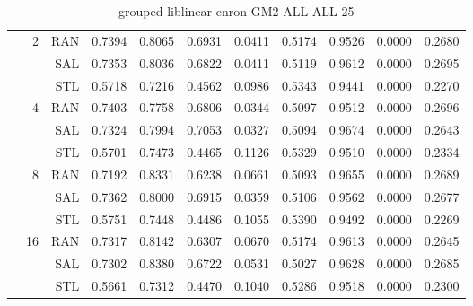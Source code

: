 \begin{center}
\begin{table}[htbp]
\begin{tabular}{ | r | r | r | r | r | r | r | r | r | r | r |}
 & \multirow{3}{*}{2} & RAN & 0.7394 & 0.8065 & 0.6931 & 0.0411 & 0.5174 & 0.9526 & 0.0000 & 0.2680\\ \cline{3-11}
 &   & SAL & 0.7353 & 0.8036 & 0.6822 & 0.0411 & 0.5119 & 0.9612 & 0.0000 & 0.2695\\ \cline{3-11}
 &   & STL & 0.5718 & 0.7216 & 0.4562 & 0.0986 & 0.5343 & 0.9441 & 0.0000 & 0.2270\\ \cline{2-11}
 & \multirow{3}{*}{4} & RAN & 0.7403 & 0.7758 & 0.6806 & 0.0344 & 0.5097 & 0.9512 & 0.0000 & 0.2696\\ \cline{3-11}
 &   & SAL & 0.7324 & 0.7994 & 0.7053 & 0.0327 & 0.5094 & 0.9674 & 0.0000 & 0.2643\\ \cline{3-11}
 &   & STL & 0.5701 & 0.7473 & 0.4465 & 0.1126 & 0.5329 & 0.9510 & 0.0000 & 0.2334\\ \cline{2-11}
 & \multirow{3}{*}{8} & RAN & 0.7192 & 0.8331 & 0.6238 & 0.0661 & 0.5093 & 0.9655 & 0.0000 & 0.2689\\ \cline{3-11}
 &   & SAL & 0.7362 & 0.8000 & 0.6915 & 0.0359 & 0.5106 & 0.9562 & 0.0000 & 0.2677\\ \cline{3-11}
 &   & STL & 0.5751 & 0.7448 & 0.4486 & 0.1055 & 0.5390 & 0.9492 & 0.0000 & 0.2269\\ \cline{2-11}
 & \multirow{3}{*}{16} & RAN & 0.7317 & 0.8142 & 0.6307 & 0.0670 & 0.5174 & 0.9613 & 0.0000 & 0.2645\\ \cline{3-11}
 &   & SAL & 0.7302 & 0.8380 & 0.6722 & 0.0531 & 0.5027 & 0.9628 & 0.0000 & 0.2685\\ \cline{3-11}
 &   & STL & 0.5661 & 0.7312 & 0.4470 & 0.1040 & 0.5286 & 0.9518 & 0.0000 & 0.2300\\ \cline{2-11}
\hline
\end{tabular}
\caption{grouped-liblinear-enron-GM2-ALL-ALL-25}
\end{table}
\end{center}

